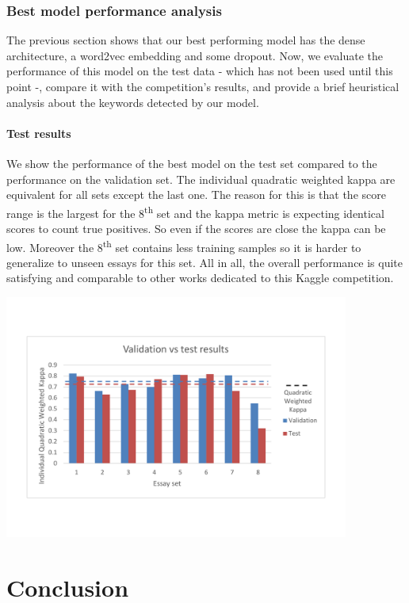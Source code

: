 \documentclass[a4paper,12pt,english]{article}
\newcommand{\TODO}{\fbox{\textcolor{red}{TODO}}}
\begin{document}
\subsubsection{Best model performance analysis}
The previous section shows that our best performing model has the dense architecture, a word2vec embedding and some dropout. Now, we evaluate the performance of this model on the test data - which has not been used until this point -, compare it with the competition's results, and provide a brief heuristical analysis about the keywords detected by our model.

\paragraph{Test results} We show the performance of the best model on the test set compared to the performance on the validation set. The individual quadratic weighted kappa are equivalent for all sets except the last one. The reason for this is that the score range is the largest for the 8\textsuperscript{th} set and the kappa metric is expecting identical scores to count true positives. So even if the scores are close the kappa can be low. Moreover the 8\textsuperscript{th} set contains less training samples so it is harder to generalize to unseen essays for this set. All in all, the overall performance is quite satisfying and comparable to other works dedicated to this Kaggle competition.

\begin{center}
\vspace*{-1.5cm}
\includegraphics[width=0.85\textwidth]{fig/test.pdf}
\vspace*{-1.5cm}
\end{center}

\section{Conclusion}
\TODO{}

 

\end{document}
